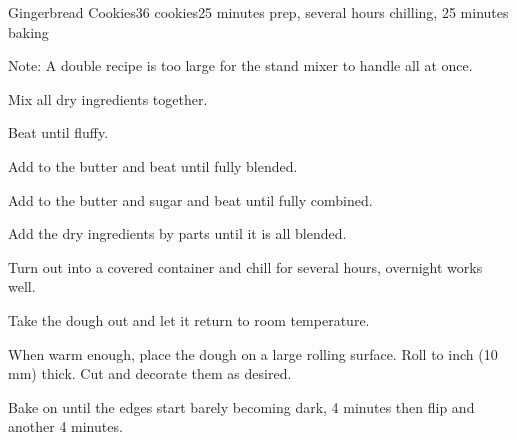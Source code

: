 \documentclass[../Cookbook.tex]{subfiles}
\begin{document}
\begin{recipe}{Gingerbread Cookies}{36 cookies}{25 minutes prep, several hours chilling, 25 minutes baking}

	Note: A double recipe is too large for the stand mixer to handle all at once.
	
	Mix all dry ingredients together.

	Beat until fluffy.

	Add to the butter and beat until fully blended.

	Add to the butter and sugar and beat until fully combined.

	Add the dry ingredients by parts until it is all blended.

	Turn out into a covered container and chill for several hours, overnight works well.

	\newstep
	Take the dough out and let it return to room temperature.

	When warm enough, place the dough on a large rolling surface.
	Roll to  inch (10 mm) thick.
	Cut and decorate them as desired.

	\newstep
	Bake on  until the edges start barely becoming dark,
	4 minutes then flip and another 4 minutes.


\end{recipe}
\end{document}
